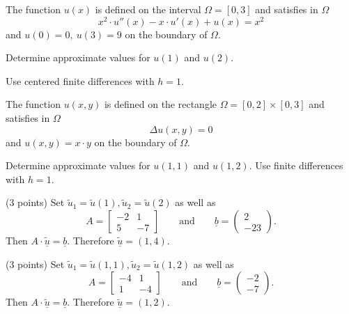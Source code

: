 \begin{teilaufgaben}
\item
The function $u(x)$ is defined on the interval $\Omega = [0,3]$ %
and satisfies in $\Omega$ 
\[
x^2 \cdot u''(x) - x \cdot u'(x) + u(x) = x^2
\]
and  $u(0) = 0, \ u(3) = 9$ on the boundary of $\Omega$. 

Determine approximate values for $u(1)$ and $u(2)$. 

Use centered finite differences with $h = 1$. 

\item
The function $u(x,y)$ is defined on the rectangle
$\Omega = [0,2] \times [0,3]$ %
and satisfies in $\Omega$ 
\[
\Delta u(x,y) = 0
\]
and $u(x,y) = x \cdot y$ on the boundary of $\Omega$.

Determine approximate values for $u(1,1)$ and $u(1,2)$.
Use finite differences with $h = 1$.
\end{teilaufgaben}

\begin{loesung}
\begin{teilaufgaben}
\item
(3 points)
Set $\tilde u_1 = \tilde u(1), \tilde u_2 = \tilde u(2)$ as well as
\[
A = \left[\begin{array}{rr} -2 & 1  \\ 5 & -7  \end{array}\right]
\qquad\text{and}\qquad
\underline{b}
=
\left(\begin{array}{r} 2 \\ -23 \end{array}\right).
\]
Then $A \cdot \underline{\tilde u} = \underline{b}$.
Therefore $\underline{\tilde u} = (1,4)$.

\item
(3 points)
Set $\tilde u_1 = \tilde u(1,1), \tilde u_2 = \tilde u(1,2)$ as well as
\[
A
=
\left[\begin{array}{rr} -4 & 1  \\ 1 & -4  \end{array}\right]
\qquad\text{and}\qquad
\underline{b} =  \left(\begin{array}{r} -2 \\ -7 \end{array}\right).
\]
Then  $A \cdot \underline{\tilde u} = \underline{b}$.
Therefore $\underline{\tilde u} = (1,2)$.
\qedhere
\end{teilaufgaben}
\end{loesung}
